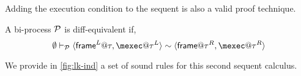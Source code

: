

Adding the execution condition to the sequent is also a valid proof technique.
\begin{lemma}
  A bi-process $\mathcal{P}$ is diff-equivalent if,
  \[ \emptyset \vdash_{\calp}  \pair{\mframe^L@\tau,\mexec@\tau^L} \sim \pair{\mframe@\tau^R,\mexec@\tau^R}\]
\end{lemma}
We provide in \cref{fig:lk-ind} a set of sound rules for this second sequent calculus.

